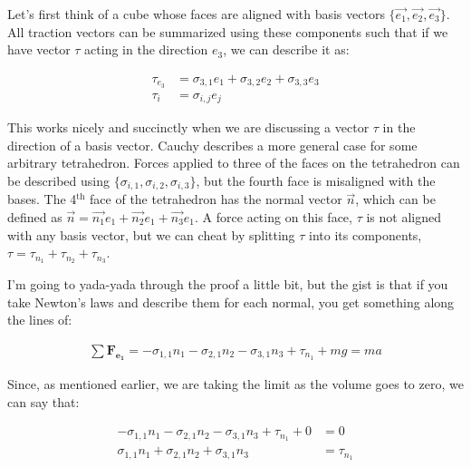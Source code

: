 \documentclass[12pt]{report}
\begin{document}
Let's first think of a cube whose faces are aligned with basis vectors $\{\Vec{e_1}, \Vec{e_2}, \Vec{e_3}\}$. All traction vectors can be summarized using these components such that if we have vector $\tau$ acting in the direction $e_3$, we can describe it as:

\begin{equation} \label{phenom1}
\begin{split}
 \tau_{e_3} &= \sigma_{3,1}e_1 + \sigma_{3,2}e_2 + \sigma_{3,3}e_3\\
\tau_{i} &= \sigma_{i,j}e_j
\end{split}
\end{equation}

This works nicely and succinctly when we are discussing a vector $\tau$ in the direction of a basis vector. Cauchy describes a more general case for some arbitrary tetrahedron. Forces applied to three of the faces on the tetrahedron can be described using $\{\sigma_{i,1}, \sigma_{i,2}, \sigma_{i,3}\}$, but the fourth face is misaligned with the bases. The 4$^\mathrm{th}$ face of the tetrahedron has the normal vector $\Vec{n}$, which can be defined as $\Vec{n} = \Vec{n_1}e_1 + \Vec{n_2}e_1 + \Vec{n_3}e_1$. A force acting on this face, $\tau$ is not aligned with any basis vector, but we can cheat by splitting $\tau$ into its components, $\tau = \tau_{n_1} + \tau_{n_2}+ \tau_{n_3}$.\newline

I'm going to yada-yada through the proof a little bit, but the gist is that if you take Newton's laws and describe them for each normal, you get something along the lines of: 

\begin{equation} \label{phenom1}
\begin{split}
\sum \mathbf{F_{e_1}} = -\sigma_{1,1}n_1 - \sigma_{2,1}n_2 - \sigma_{3,1}n_3 + \tau_{n_1} + mg = ma
\end{split}
\end{equation}

Since, as mentioned earlier, we are taking the limit as the volume goes to zero, we can say that: 

\begin{equation} \label{phenom1}
\begin{split}
-\sigma_{1,1}n_1 - \sigma_{2,1}n_2 - \sigma_{3,1}n_3 + \tau_{n_1} + 0 &= 0 \\ 
\sigma_{1,1}n_1 + \sigma_{2,1}n_2 + \sigma_{3,1}n_3 &= \tau_{n_1}  \\ 
\end{split}
\end{equation}
\end{document}
